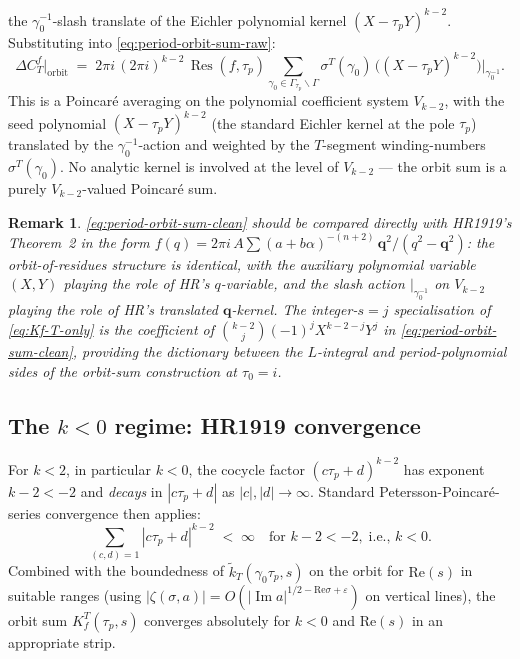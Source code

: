 \documentclass[11pt]{article}
\newtheorem{remark}[theorem]{Remark}
\DeclareMathOperator{\Res}{Res}
\DeclareMathOperator{\im}{Im}
\newcommand{\re}{\mathrm{Re}}
\newcommand{\eps}{\varepsilon}
\begin{document}
the $\gamma_0^{-1}$-slash translate of the Eichler polynomial kernel
$(X - \tau_p Y)^{k - 2}$.  Substituting into
\eqref{eq:period-orbit-sum-raw}:
\begin{equation}\label{eq:period-orbit-sum-clean}
  \Delta C^f_T\bigl|_{\text{orbit}}
  \;=\; 2\pi i\,(2\pi i)^{k - 2}\,\Res(f, \tau_p)\!
  \sum_{\gamma_0 \in \Gamma_{\tau_p}\backslash\Gamma}\!
  \sigma^T(\gamma_0)\,
  \bigl((X - \tau_p Y)^{k - 2}\bigr)\big|_{\gamma_0^{-1}}.
\end{equation}
This is a Poincar\'e averaging on the polynomial coefficient system
$V_{k - 2}$, with the seed polynomial $(X - \tau_p Y)^{k - 2}$
(the standard Eichler kernel at the pole $\tau_p$) translated by
the $\gamma_0^{-1}$-action and weighted by the $T$-segment
winding-numbers $\sigma^T(\gamma_0)$.  No analytic kernel is involved
at the level of $V_{k - 2}$ — the orbit sum is a purely
$V_{k - 2}$-valued Poincar\'e sum.

\begin{remark}
\eqref{eq:period-orbit-sum-clean} should be compared directly with
HR1919's Theorem~2 in the form
$f(q) = 2\pi i\,A\sum (a + b\alpha)^{-(n+2)}\,\mathbf{q}^2/(q^2 - \mathbf{q}^2)$:
the orbit-of-residues structure is identical, with the auxiliary
polynomial variable $(X, Y)$ playing the role of HR's $q$-variable,
and the slash action $|_{\gamma_0^{-1}}$ on $V_{k-2}$ playing the role
of HR's translated $\mathbf{q}$-kernel.  The integer-$s = j$
specialisation of \eqref{eq:Kf-T-only} is the coefficient of
$\binom{k-2}{j}(-1)^j X^{k-2-j} Y^j$ in
\eqref{eq:period-orbit-sum-clean}, providing the dictionary between
the $L$-integral and period-polynomial sides of the orbit-sum
construction at $\tau_0 = i$.
\end{remark}

\subsection{The $k < 0$ regime: HR1919 convergence}\label{subsec:k-negative}

For $k < 2$, in particular $k < 0$, the cocycle factor
$(c\tau_p + d)^{k - 2}$ has exponent $k - 2 < -2$ and \emph{decays}
in $|c\tau_p + d|$ as $|c|, |d| \to \infty$.  Standard
Petersson-Poincar\'e-series convergence then applies:
\begin{equation}\label{eq:Petersson-convergence}
  \!\!\sum_{(c, d) = 1}\!|c\tau_p + d|^{k - 2}
  \;<\; \infty
  \quad\text{for } k - 2 < -2,\; \text{i.e., } k < 0.
\end{equation}
Combined with the boundedness of $\widetilde{k}_T(\gamma_0\tau_p, s)$
on the orbit for $\re(s)$ in suitable ranges (using
$|\zeta(\sigma, a)| = O(|\im a|^{1/2 - \re\sigma + \eps})$ on
vertical lines), the orbit sum $K_f^T(\tau_p, s)$ converges
absolutely for $k < 0$ and $\re(s)$ in an appropriate strip.
\end{document}
